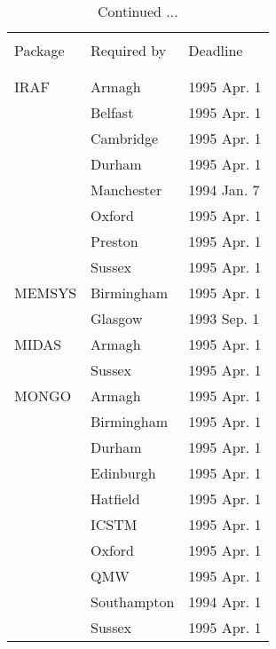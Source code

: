 \addtocounter{table}{-1}
\begin{table}
\caption{Continued ...}
\vspace{5mm}
\begin{center}
\begin{tabular}{|p{36mm}|p{50mm}|p{30mm}|} \hline
& & \\
Package & Required by & Deadline \\
& & \\ \hline
& & \\
IRAF                  & Armagh           & 1995 Apr. 1 \\
                      & Belfast          & 1995 Apr. 1 \\
                      & Cambridge        & 1995 Apr. 1 \\
                      & Durham           & 1995 Apr. 1 \\
                      & Manchester       & 1994 Jan. 7 \\
                      & Oxford           & 1995 Apr. 1 \\
                      & Preston          & 1995 Apr. 1 \\
                      & Sussex           & 1995 Apr. 1 \\
MEMSYS                & Birmingham       & 1995 Apr. 1 \\
                      & Glasgow          & 1993 Sep. 1 \\
MIDAS                 & Armagh           & 1995 Apr. 1 \\
                      & Sussex           & 1995 Apr. 1 \\
MONGO                 & Armagh           & 1995 Apr. 1 \\
                      & Birmingham       & 1995 Apr. 1 \\
                      & Durham           & 1995 Apr. 1 \\
                      & Edinburgh        & 1995 Apr. 1 \\
                      & Hatfield         & 1995 Apr. 1 \\
                      & ICSTM            & 1995 Apr. 1 \\
                      & Oxford           & 1995 Apr. 1 \\
                      & QMW              & 1995 Apr. 1 \\
                      & Southampton      & 1994 Apr. 1 \\
                      & Sussex           & 1995 Apr. 1 \\

\end{tabular}
\end{center}
\end{table}
